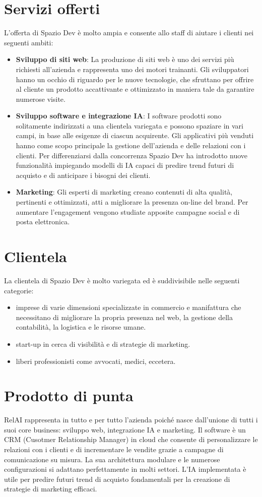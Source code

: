 \section{Servizi offerti}
L'offerta di Spazio Dev è molto ampia e consente allo staff di aiutare i clienti nei seguenti ambiti:
\begin{itemize}
  \item \textbf{Sviluppo di siti web}: La produzione di siti web è uno dei servizi più richiesti all'azienda e rappresenta uno dei motori trainanti. Gli sviluppatori hanno un occhio di riguardo per le nuove tecnologie, che sfruttano per offrire al cliente un prodotto accattivante e ottimizzato in maniera tale da garantire numerose visite.
  \item \textbf{Sviluppo software e integrazione IA}: I software prodotti sono solitamente indirizzati a una clientela variegata e possono spaziare in vari campi, in base alle esigenze di ciascun acquirente. Gli applicativi più venduti hanno come scopo principale la gestione dell'azienda e delle relazioni con i clienti. Per differenziarsi dalla concorrenza Spazio Dev ha introdotto nuove funzionalità impiegando modelli di IA capaci di predire trend futuri di acquisto e  di anticipare i bisogni dei clienti.
  \item \textbf{Marketing}: Gli esperti di marketing creano contenuti di alta qualità, pertinenti e ottimizzati, atti a migliorare la presenza on-line del brand. Per aumentare l'engagement vengono studiate apposite campagne social e di posta elettronica.
\end{itemize}

\section{Clientela}
La clientela di Spazio Dev è molto variegata ed è suddivisibile nelle seguenti categorie:
\begin{itemize}
  \item imprese di varie dimensioni specializzate in commercio e manifattura che necessitano di migliorare la propria presenza nel web, la gestione della contabilità, la logistica e le risorse umane.
  \item start-up in cerca di visibilità e di strategie di marketing.
  \item liberi professionisti come avvocati, medici, eccetera.
\end{itemize}


\section{Prodotto di punta}
RelAI rappresenta in tutto e per tutto l'azienda poiché nasce dall'unione di tutti i suoi core business: sviluppo web, integrazione IA e marketing.
Il software è un CRM (Cusotmer Relationship Manager) in cloud che consente di personalizzare le relazioni con i clienti e di incrementare le vendite grazie a campagne di comunicazione su misura.
La sua architettura modulare e le numerose configurazioni si adattano perfettamente in molti settori. L'IA implementata è utile per predire futuri trend di acquisto fondamentali per la creazione di strategie di marketing efficaci. 


